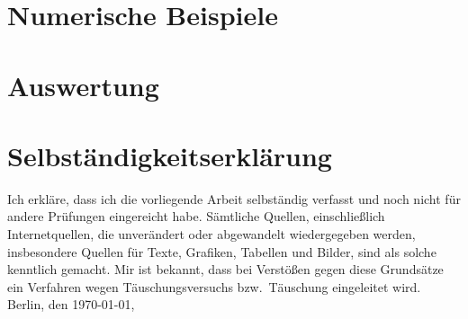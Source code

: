 \documentclass[draft=false,twoside,11pt]{scrreprt}
\begin{document}
\chapter{Numerische Beispiele}
\label{chap:experiments}


\chapter{Auswertung}
\label{chap:review}


%
%


\printbibliography

\chapter*{Selbständigkeitserklärung}
Ich erkläre, dass ich die vorliegende Arbeit selbständig verfasst und noch nicht 
für andere Prüfungen eingereicht habe. Sämtliche Quellen, einschließlich
Internetquellen, die unverändert oder abgewandelt wiedergegeben werden,
insbesondere Quellen für Texte, Grafiken, Tabellen und Bilder, sind als solche
kenntlich gemacht. Mir ist bekannt, dass bei Verstößen gegen diese Grundsätze ein
Verfahren wegen Täuschungsversuchs bzw.\ Täuschung eingeleitet wird. 
\bigbreak
\noindent Berlin, den \today, 
\end{document}
